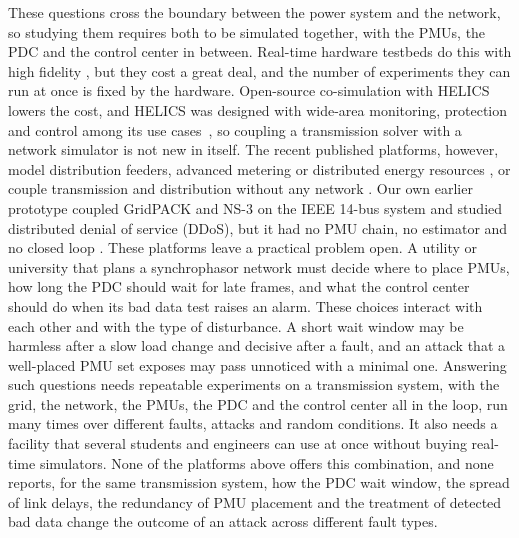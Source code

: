 \documentclass[journal]{IEEEtran}
\begin{document}
These questions cross the boundary between the power system and the network, so studying them requires both to be simulated together, with the PMUs, the PDC and the control center in between. Real-time hardware testbeds do this with high fidelity \cite{kumar2025rtcptc,nguyen2024rtcps,das2025scalable,mishchenko2024multidomain}, but they cost a great deal, and the number of experiments they can run at once is fixed by the hardware. Open-source co-simulation with HELICS~\cite{palmintier2017helics,hardy2024helics} lowers the cost, and HELICS was designed with wide-area monitoring, protection and control among its use cases~\cite{palmintier2017helics}, so coupling a transmission solver with a network simulator is not new in itself. The recent published platforms, however, model distribution feeders, advanced metering or distributed energy resources \cite{bel2024natig,thioub2026gridsecsim,vallamkondu2025der,masood2026cosim}, or couple transmission and distribution without any network \cite{zheng2024hpc}. Our own earlier prototype coupled GridPACK and NS-3 on the IEEE 14-bus system and studied distributed denial of service (DDoS), but it had no PMU chain, no estimator and no closed loop \cite{islam2024remotely}. These platforms leave a practical problem open. A utility or university that plans a synchrophasor network must decide where to place PMUs, how long the PDC should wait for late frames, and what the control center should do when its bad data test raises an alarm. These choices interact with each other and with the type of disturbance. A short wait window may be harmless after a slow load change and decisive after a fault, and an attack that a well-placed PMU set exposes may pass unnoticed with a minimal one. Answering such questions needs repeatable experiments on a transmission system, with the grid, the network, the PMUs, the PDC and the control center all in the loop, run many times over different faults, attacks and random conditions. It also needs a facility that several students and engineers can use at once without buying real-time simulators. None of the platforms above offers this combination, and none reports, for the same transmission system, how the PDC wait window, the spread of link delays, the redundancy of PMU placement and the treatment of detected bad data change the outcome of an attack across different fault types.
\end{document}

